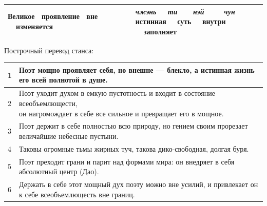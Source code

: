 \documentclass[a4paper]{article}
\begin{document}
\begin{flushleft}
\begin{supertabular}{|m{1.3712599in}m{2.6712599in}m{2.55316in}|}
{{ Великое \ проявление \ вне \ \ изменяется\textit{ }}} &
{ \textit{чжэнь \ \ ти \ \ \ нэй \ \ \ \ чун}\newline
истинная \ \ суть \ \ внутри \ \ заполняет}\\\hline
\end{supertabular}
\end{flushleft}
{
Построчный перевод станса:}

\begin{flushleft}
\tablefirsthead{}
\tablehead{}
\tabletail{}
\tablelasttail{}
\begin{supertabular}{|m{0.14765984in}|m{6.34836in}|}
\hline
{ 1} &
{ Поэт мощно проявляет себя, но внешне — блекло, а истинная жизнь его всей полнотой в
душе.}\\\hline
{ 2} &
{ Поэт уходит духом в емкую пустотность и входит в состояние всеобъемлющести,\newline
он нагромождает в себе все сильное и превращает его в мощное.}\\\hline
{ 3} &
{ Поэт держит в себе полностью всю природу, но гением своим прорезает величайшие небесные
пустыни.}\\\hline
{ 4} &
{ Таковы огромные тьмы жирных туч, такова дико-свободная, долгая буря.}\\\hline
{ 5} &
{ Поэт преходит грани и парит над формами мира: он внедряет в себя абсолютный центр
(Дао).}\\\hline
{ 6} &
{ Держать в себе этот мощный дух поэту можно вне усилий, и привлекает он к себе всеобъемлющесть
вне границ.}\\\hline
\end{supertabular}
\end{flushleft}
\end{document}
